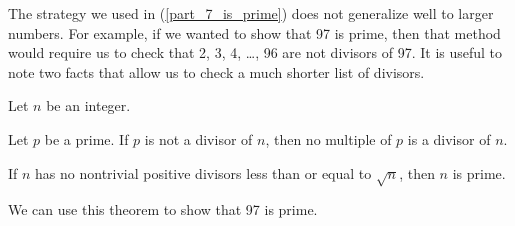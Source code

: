 The strategy we used in  (\ref{part_7_is_prime}) does not generalize well to larger numbers.  For example, if we wanted to show that 97 is prime, then that method would require us to check that 2, 3, 4, \ldots, 96 are not divisors of 97.  It is useful to note two facts that allow us to check a much shorter list of divisors.

\begin{thm}
\label{thm_show_is_prime}
    Let $n$ be an integer.
        \begin{apart}
            \item \label{part_only_check_prime_divisors} Let $p$ be a prime.  If $p$ is not a divisor of $n$, then no multiple of $p$ is a divisor of $n$.
            \item \label{part_only_check_to_sqrtn} If $n$ has no nontrivial positive divisors less than or equal to $\sqrt{n}$, then $n$ is prime.
        \end{apart}
\end{thm}

We can use this theorem to show that 97 is prime.

